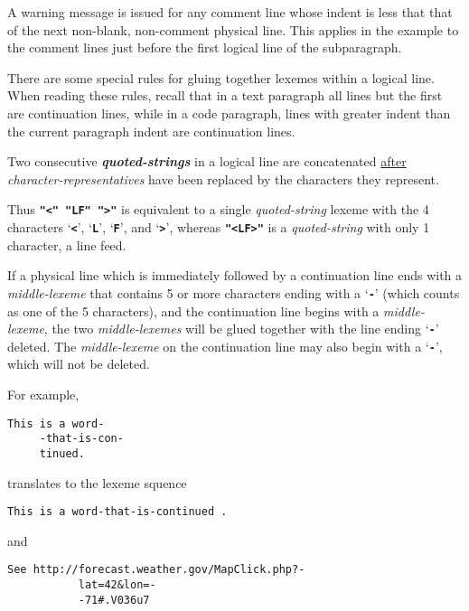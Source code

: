 \documentclass[12pt]{article}
\makeatletter
\newcommand{\TT}[1]{{\tt \bfseries #1}}
\newcommand{\emskey}[2]{{\bf \em #1#2}\index{#1@{\em #1}}}
\newenvironment{indpar}[1][0.3in]%
	{\begin{list}{}%
		     {\setlength{\itemsep}{0in}%
		      \setlength{\topsep}{0in}%
		      \setlength{\parsep}{1ex}%
		      \setlength{\labelwidth}{#1}%
		      \setlength{\leftmargin}{#1}%
		      \addtolength{\leftmargin}{\labelsep}}%
	 \item}%
	{\end{list}}
\makeatother
\begin{document}
A warning message is issued for any comment line whose indent is
less that that of the next non-blank, non-comment physical line.
This applies in the example to the comment lines just before the
first logical line of the subparagraph.

There are some special rules for gluing together lexemes within
a logical line.  When reading these rules, recall that in a text
paragraph all lines but the first are continuation lines, while
in a code paragraph, lines with greater indent than the current paragraph
indent are continuation lines.

\begin{enumerate}
\item Two consecutive \emskey{quoted-string}s in a logical line
are concatenated \underline{after} {\em character-represen\-ta\-tives}
have been replaced by the characters they represent.

Thus \TT{"<" "LF" ">"} is equivalent to a single {\em quoted-string}
lexeme with the 4 characters `\TT{<}', `\TT{L}', `\TT{F}', and
`\TT{>}', whereas \TT{"<LF>"} is a {\em quoted-string} with only
1 character, a line feed.

\label{CONTINUATION-GLUING}
\item
If a physical line which is immediately followed by a continuation line
ends with a {\em middle-lexeme} that
contains 5 or more characters ending with a `\TT{-}' (which counts as
one of the 5 characters),
and the continuation line begins with a {\em middle-lexeme},
the two {\em middle-lexemes}
will be glued together with the line ending `\TT{-}' deleted.
The {\em middle-lexeme} on the continuation line may also begin
with a `\TT{-}', which will not be deleted.

For example,

\begin{indpar}\begin{verbatim}
This is a word-
     -that-is-con-
     tinued.
\end{verbatim}\end{indpar}

translates to the lexeme squence

\begin{indpar}\begin{verbatim}
This is a word-that-is-continued .
\end{verbatim}\end{indpar}

and

\begin{indpar}\begin{verbatim}
See http://forecast.weather.gov/MapClick.php?-
           lat=42&lon=-
           -71#.V036u7
\end{verbatim}\end{indpar}


\end{enumerate}
\end{document}
